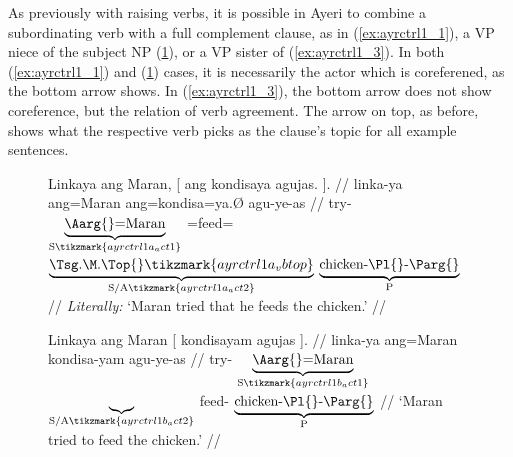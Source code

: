 As previously with raising verbs, it is possible in Ayeri to combine a
subordinating verb with a full complement clause, as in (\ref{ex:ayrctrl1_1}),
a VP niece of the subject NP (\ref{ex:ayrctrl1_2}), or a VP sister of 
(\ref{ex:ayrctrl1_3}). In both (\ref{ex:ayrctrl1_1}) and (\ref{ex:ayrctrl1_2})
cases, it is necessarily the actor which is coreferened, as the bottom arrow
shows. In (\ref{ex:ayrctrl1_3}), the bottom arrow does not show coreference,
but the relation of verb agreement. The arrow on top, as before, shows what the
respective verb picks as the clause's topic for all example sentences.

\begin{figure}
\pex\label{ex:ayrctrl1}
\a\label{ex:ayrctrl1_1}\begingl[aboveglcskip=1.5em, aboveglftskip=1.75em]
	\gla Linkaya {ang Maran}, \textup{[} {ang kondisaya} agujas. 
		\textup{]}. //
	\glb linka-ya ang=Maran {} ang=kondisa=ya.Ø agu-ye-as {} //
	\glc try-\TsgM{}
		$\underbrace{\text{\Aarg{}=Maran}}_{\text{S}%
			\tikzmark{ayrctrl1a_act1}
		}$
		{}
		\AgtT{}=feed=$\underbrace{\text{\smash{\TsgM{}}.\Top{}}%
			\tikzmark{ayrctrl1a_vbtop}
		}_{\text{S/A}%
			\tikzmark{ayrctrl1a_act2}
		}$
		$\underbrace{\text{chicken-\Pl{}-\Parg{}}}_{\text{P}}$
		{}
		//
	\glft \textit{Literally:} `Maran tried that he feeds the chicken.' //
\endgl
{}

\a\label{ex:ayrctrl1_2}\begingl[aboveglftskip=1.75em]
	\gla Linkaya {ang Maran} \textup{[} {} kondisayam agujas
		\textup{]}. //
	\glb linka-ya ang=Maran {} {} kondisa-yam agu-ye-as {} //
	\glc try-\TsgM{}
		$\underbrace{\text{\Aarg{}=Maran}}_{\text{S}%
			\tikzmark{ayrctrl1b_act1}
		}$
		{}
		$\underbrace{}_{\text{S/A}\tikzmark{ayrctrl1b_act2}}$
		feed-\Ptcp{}
		$\underbrace{\text{chicken-\Pl{}-\Parg{}}}_{\text{P}}$
		{}
		//
	\glft `Maran tried to feed the chicken.' //
\endgl
{}


\end{figure}
